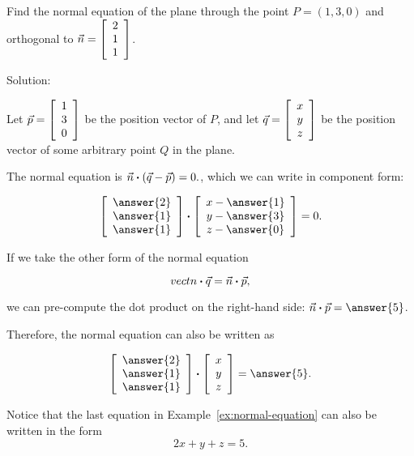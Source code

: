 \documentclass{ximera}
\begin{document}
\begin{example}\label{ex:normal-equation}

  Find the normal equation of the plane through the point $P=(1,3,0)$
  and orthogonal to $\vect{n}=\startmat{c}2\\1\\1\stopmat$.

  Solution:

  Let $\vect{p}=\startmat{c}1\\3\\0\stopmat$ be the position vector of $P$, and let
  $\vect{q}=\startmat{c}x\\y\\z\stopmat$ be the position vector of some arbitrary
  point $Q$ in the plane. 
  
  The normal equation is
  $\vect{n} \dotprod (\vec{q}-\vect{p}) = 0.$, which we
  can write in component form:

  \begin{equation*}
    \startmat{c}\answer{2}\\\answer{1}\\\answer{1}\stopmat
    \dotprod
    \startmat{c}x-\answer{1}\\y-\answer{3}\\z-\answer{0}\stopmat
    =0.
  \end{equation*}

  If we take the other form of the normal equation 
  
  $$vect{n} \dotprod \vect{q} = \vect{n} \dotprod \vect{p},$$
  
  we can pre-compute the dot product on the right-hand side:
  $\vect{n} \dotprod \vect{p} = \answer{5}$. 
  
  Therefore, the
  normal equation can also be written as

  \begin{equation*}
    \startmat{c}\answer{2}\\\answer{1}\\\answer{1}\stopmat
    \dotprod
    \startmat{c}x\\y\\z\stopmat
    = \answer{5}.
  \end{equation*}
\end{example}

Notice that the last equation in Example~\ref{ex:normal-equation} can
also be written in the form
\begin{equation*}
  2x + y + z = 5.
\end{equation*}
\end{document}
